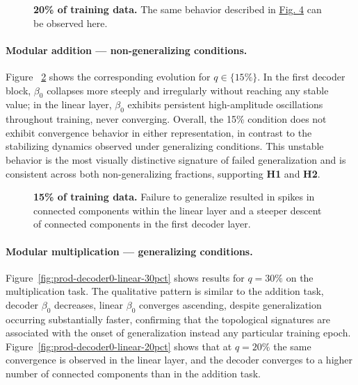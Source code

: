 \begin{figure}
    
    
    \caption[20\% of training data.]{\textbf{20\% of training data.} The same behavior described in \hyperref[fig:sum-decoder0-linear-30pct]{Fig. 4} can be observed here.}
    \label{fig:sum-decoder0-linear-20pct}
\end{figure}

\paragraph{Modular addition — non-generalizing conditions.}
Figure ~\ref{fig:sum-decoder0-linear-15pct} shows the corresponding evolution for $q \in \{15\%\}$. In the first decoder block, $\beta_0$ collapses more steeply and irregularly without reaching any stable value; in the linear layer, $\beta_0$ exhibits persistent high-amplitude oscillations throughout training, never converging. Overall, the 15\% condition does not exhibit convergence behavior in either representation, in contrast to the stabilizing dynamics observed under generalizing conditions. This unstable behavior is the most visually distinctive signature of failed generalization and is consistent across both non-generalizing fractions, supporting \textbf{H1} and \textbf{H2}.

\begin{figure}
    
    
    \caption[15\% of training data.]{\textbf{15\% of training data.} Failure to generalize resulted in spikes in connected components within the linear layer and a steeper descent of connected components in the first decoder layer.}
    \label{fig:sum-decoder0-linear-15pct}
\end{figure}


\paragraph{Modular multiplication — generalizing conditions.}
Figure~\ref{fig:prod-decoder0-linear-30pct} shows results for $q = 30\%$ on the multiplication task. The qualitative pattern is similar to the addition task,  decoder $\beta_0$ decreases, linear $\beta_0$ converges ascending, despite generalization occurring substantially faster, confirming that the topological signatures are associated with the onset of generalization instead any particular training epoch. Figure~\ref{fig:prod-decoder0-linear-20pct} shows that at $q = 20\%$ the same convergence is observed in the linear layer, and the decoder converges to a higher number of connected components than in the addition task.

